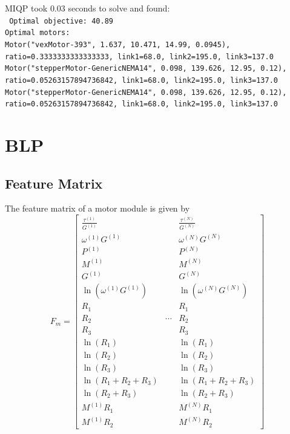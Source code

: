 \documentclass{article}
\begin{document}
MIQP took $0.03$ seconds to solve and found: \\
\texttt{
    Optimal objective: 40.89 \\
    Optimal motors: \\
    Motor("vexMotor-393", 1.637, 10.471, 14.99, 0.0945), ratio=0.3333333333333333, link1=68.0, link2=195.0, link3=137.0 \\
    Motor("stepperMotor-GenericNEMA14", 0.098, 139.626, 12.95, 0.12), ratio=0.05263157894736842, link1=68.0, link2=195.0, link3=137.0 \\
    Motor("stepperMotor-GenericNEMA14", 0.098, 139.626, 12.95, 0.12), ratio=0.05263157894736842, link1=68.0, link2=195.0, link3=137.0
}

\FloatBarrier{}
\section{BLP}

\FloatBarrier{}
\subsection{Feature Matrix}

The feature matrix of a motor module is given by
\begin{equation}
    F_m =
    \begin{bmatrix}
        \frac{\tau^{(1)}}{G^{(1)}} & & \frac{\tau^{(N)}}{G^{(N)}} \\[6pt]
        \omega^{(1)} G^{(1)} & & \omega^{(N)} G^{(N)} \\[6pt]
        P^{(1)} & & P^{(N)} \\[6pt]
        M^{(1)} & & M^{(N)} \\[6pt]
        G^{(1)} & & G^{(N)} \\[6pt]
        \ln(\omega^{(1)} G^{(1)}) & & \ln(\omega^{(N)} G^{(N)}) \\[6pt]
        R_1 & & R_1 \\[6pt]
        R_2 & \cdots & R_2 \\[6pt]
        R_3 & & R_3 \\[6pt]
        \ln(R_1) & & \ln(R_1) \\[6pt]
        \ln(R_2) & & \ln(R_2) \\[6pt]
        \ln(R_3) & & \ln(R_3) \\[6pt]
        \ln(R_1 + R_2 + R_3) & & \ln(R_1 + R_2 + R_3) \\[6pt]
        \ln(R_2 + R_3) & & \ln(R_2 + R_3) \\[6pt]
        M^{(1)} R_1 & & M^{(N)} R_1 \\[6pt]
        M^{(1)} R_2 & & M^{(N)} R_2
    \end{bmatrix}
\end{equation}
\end{document}

